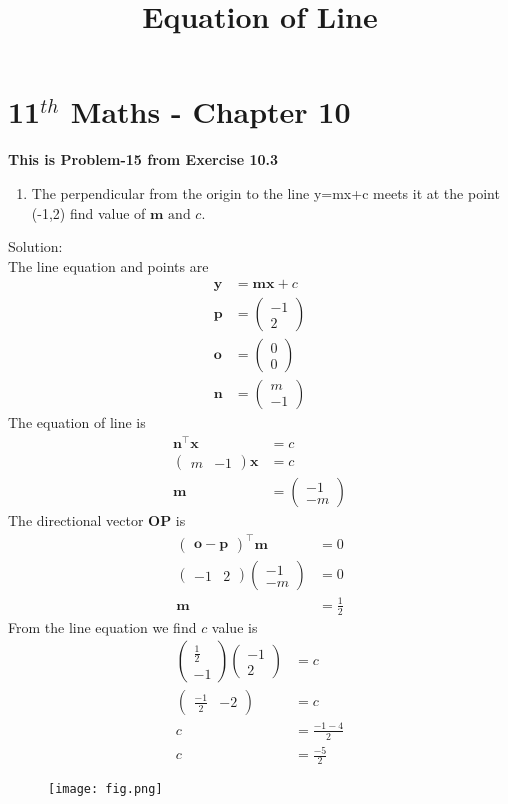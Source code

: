 \documentclass[journel,12pt,twocolumn]{article}
\newcommand{\myvec}[1]{\ensuremath{\begin{pmatrix}#1\end{pmatrix}}}
\let\vec\mathbf
\begin{document}
\begin{center}
\title{\textbf{Equation of Line}}
\date{\vspace{-5ex}} %
\maketitle
\end{center}
\section{11$^{th}$ Maths - Chapter 10}
\textbf{This is Problem-15 from Exercise 10.3}
\begin{enumerate}
\item The perpendicular from the origin to the line y=mx+c meets it at the point (-1,2) find value of $\vec{m}\text{ and }c$.
\end{enumerate}
Solution:
\\
The line equation and points are
\begin{align}
\vec{y}&=\vec{m}\vec{x}+c\\
\vec{p}&=\myvec{-1\\2}\\
\vec{o}&=\myvec{0\\0}\\
\vec{n}&=\myvec{m\\-1}
\end{align}
The equation of line is
\begin{align}
\vec{n}^{\top}\vec{x}&=c\\
\myvec{m&-1}\vec{x}&=c\\
\vec{m}&=\myvec{-1\\-m}
\end{align}
The directional vector $\vec{OP}$ is 
\begin{align}
\myvec{\vec{o}-\vec{p}}^{\top}\vec{m}&=0\\
\myvec{-1&2}\myvec{-1\\-m}&=0\\
\vec{m}&=\frac{1}{2}
\end{align}
From the line equation we find $c$ value is
\begin{align}
\myvec{\frac{1}{2}\\-1}\myvec{-1\\2}&=c\\
\myvec{\frac{-1}{2}&-2}&=c\\
c&=\frac{-1-4}{2}\\
c&=\frac{-5}{2}
\end{align}
\begin{figure}[!h]
\centering
\texttt{[image: fig.png]}
\caption{}
  \label{fig:Figure}
\end{figure}
\end{document}
